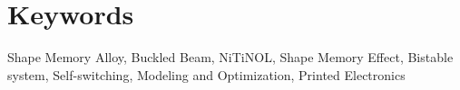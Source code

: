 \section{Keywords}\label{sec:keywords}

Shape Memory Alloy, Buckled Beam, NiTiNOL, Shape Memory Effect, Bistable system, Self-switching, Modeling and Optimization, Printed Electronics
